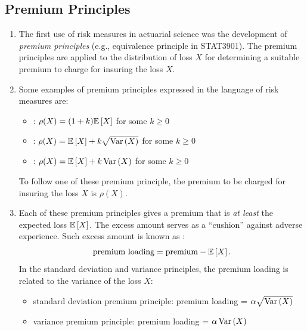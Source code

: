 \subsection{Premium Principles}
\begin{enumerate}
\item The first use of risk measures in actuarial science was the development
of \emph{premium principles} (e.g., equivalence principle in STAT3901). The
premium principles are applied to the distribution of loss
\(X\) for determining a suitable premium to charge for insuring the loss
\(X\).

\item Some examples of premium principles expressed in the language of risk
measures are:
\begin{itemize}
\item {}: \(\rho(X)=(1+k)\mathbb{E}\left[X\right]\)
for some \(k\ge 0\)
\item {}: \(\rho(X)=\mathbb{E}\left[X\right]+k\sqrt{\operatorname{Var}\left(X\right)}\)
for some \(k\ge 0\)
\item {}: \(\rho(X)=\mathbb{E}\left[X\right]+k\operatorname{Var}\left(X\right)\)
for some \(k\ge 0\)
\end{itemize}
\begin{note}
To follow one of these premium principle, the premium to be charged for
insuring the loss \(X\) is \(\rho(X)\).
\end{note}

\item Each of these premium principles gives a premium that is \emph{at least}
the expected loss \(\mathbb{E}\left[X\right]\). The excess amount serves as a ``cushion''
against adverse experience. Such excess amount is known as :
\[
\text{premium loading}=\text{premium}-\mathbb{E}\left[X\right].
\]
In the standard deviation and variance principles, the premium loading is
related to the variance of the loss \(X\):
\begin{itemize}
\item standard deviation premium principle: premium loading = \(\alpha\sqrt{\operatorname{Var}\left(X\right)}\)
\item variance premium principle: premium loading = \(\alpha\operatorname{Var}\left(X\right)\)
\end{itemize}
\end{enumerate}
